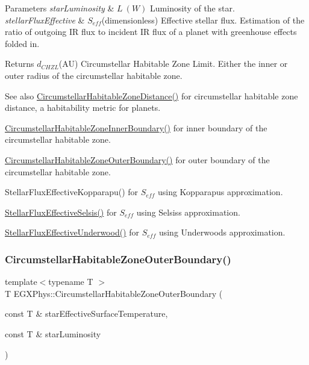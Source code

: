 \begin{DoxyParams}{Parameters}
{\em star\+Luminosity} & $L\ (W)$ Luminosity of the star. \\
\hline
{\em stellar\+Flux\+Effective} & $S_{eff}$(dimensionless) Effective stellar flux. Estimation of the ratio of outgoing IR flux to incident IR flux of a planet with greenhouse effects folded in. \\
\hline
\end{DoxyParams}
\begin{DoxyReturn}{Returns}
$d_{CHZL}$(AU) Circumstellar Habitable Zone Limit. Either the inner or outer radius of the circumstellar habitable zone. 
\end{DoxyReturn}
\begin{DoxySeeAlso}{See also}
\hyperlink{group___astrophysics_gacf3a720793cdb27f6d93b170b44e81be}{Circumstellar\+Habitable\+Zone\+Distance()} for circumstellar habitable zone distance, a habitability metric for planets. 

\hyperlink{group___astrophysics_ga9ee2e8023cb444aa4638c962788b5853}{Circumstellar\+Habitable\+Zone\+Inner\+Boundary()} for inner boundary of the circumstellar habitable zone. 

\hyperlink{group___astrophysics_gaa47fcde814ba8007de800e930fc0a08d}{Circumstellar\+Habitable\+Zone\+Outer\+Boundary()} for outer boundary of the circumstellar habitable zone. 

Stellar\+Flux\+Effective\+Kopparapu() for $S_{eff}$ using Kopparapu\textquotesingle{}s approximation. 

\hyperlink{group___astrophysics_ga3ce3a04fec7b1c8fb66ac54270ce3902}{Stellar\+Flux\+Effective\+Selsis()} for $S_{eff}$ using Selsis\textquotesingle{}s approximation. 

\hyperlink{group___astrophysics_ga34d1e39bce17904bc6d383f1935c79d6}{Stellar\+Flux\+Effective\+Underwood()} for $S_{eff}$ using Underwood\textquotesingle{}s approximation. 
\end{DoxySeeAlso}
\mbox{\label{group___astrophysics_gaa47fcde814ba8007de800e930fc0a08d}} 
\subsubsection{\texorpdfstring{Circumstellar\+Habitable\+Zone\+Outer\+Boundary()}{CircumstellarHabitableZoneOuterBoundary()}}
{\footnotesize\ttfamily template$<$typename T $>$ \\
T E\+G\+X\+Phys\+::\+Circumstellar\+Habitable\+Zone\+Outer\+Boundary (\begin{DoxyParamCaption}\item[{const T \&}]{star\+Effective\+Surface\+Temperature,  }\item[{const T \&}]{star\+Luminosity }\end{DoxyParamCaption})}



